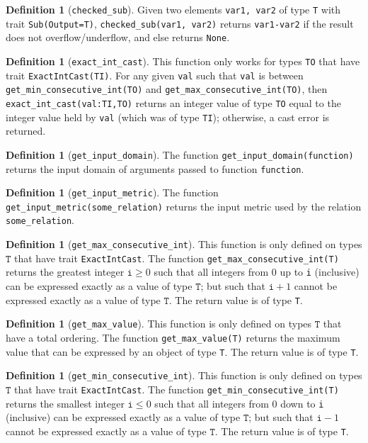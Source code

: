 \documentclass[11pt,a4paper]{article}
\theoremstyle{definition}
\newtheorem{definition}[theorem]{Definition}
\newcommand{\T}{\texttt{T}}
\begin{document}
\begin{definition}[\texttt{checked\_sub}]
     Given two elements \texttt{var1, var2} of type \texttt{T} with trait \texttt{Sub(Output=T)}, \texttt{checked\_sub(var1, var2)} returns \texttt{var1-var2} if the result does not overflow/underflow, and else returns \texttt{None}.
\end{definition}
\begin{definition}[\texttt{exact\_int\_cast}]
    This function only works for types \texttt{TO} that have trait \texttt{ExactIntCast(TI)}. For any given \texttt{val} such that \texttt{val} is between \texttt{get\_min\_consecutive\_int(TO)} and \texttt{get\_max\_consecutive\_int(TO)}, then \texttt{exact\_int\_cast(val:TI,TO)} returns an integer value of type \texttt{TO} equal to the integer value held by  \texttt{val} (which was of type \texttt{TI}); otherwise, a cast error is returned.
\end{definition}
\begin{definition}[\texttt{get\_input\_domain}]
    The function \texttt{get\_input\_domain(function)} returns the input domain of arguments passed to function \texttt{function}.
\end{definition}
\begin{definition}[\texttt{get\_input\_metric}]
    The function \texttt{get\_input\_metric(some\_relation)} returns the input metric used by the relation \texttt{some\_relation}.
\end{definition}
\begin{definition}[\texttt{get\_max\_consecutive\_int}]
    This function is only defined on types $\T$ that have trait \texttt{ExactIntCast}. The function \texttt{get\_max\_consecutive\_int(T)} returns the greatest integer $\texttt{i}\geq 0$ such that all integers from 0 up to \texttt{i} (inclusive) can be expressed exactly as a value of type $\T$; but such that $\texttt{i}+1$ cannot be expressed exactly as a value of type $\T$. The return value is of type \texttt{T}.
\end{definition}
\begin{definition}[\texttt{get\_max\_value}]
    This function is only defined on types $\T$ that have a total ordering. The function \texttt{get\_max\_value(T)} returns the maximum value that can be expressed by an object of type \texttt{T}. The return value is of type \texttt{T}.
\end{definition}
\begin{definition}[\texttt{get\_min\_consecutive\_int}]
    This function is only defined on types $\T$ that have trait \texttt{ExactIntCast}. The function \texttt{get\_min\_consecutive\_int(T)} returns the smallest integer $\texttt{i}\leq 0$ such that all integers from 0 down to \texttt{i} (inclusive) can be expressed exactly as a value of type $\T$; but such that $\texttt{i}-1$ cannot be expressed exactly as a value of type $\T$. The return value is of type \texttt{T}.
\end{definition}
\end{document}
